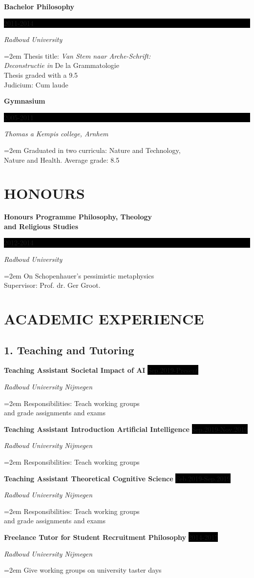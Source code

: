 \documentclass{article}
\newcommand{\sepspace}{\vspace*{1em}}		%
\newcommand{\NewPart}[1]{\section*{\uppercase{#1}}}
\newcommand{\EducationEntry}[4]{
		\noindent \textbf{#1} \hfill      %
		\colorbox{Black}{%
			\parbox{6em}{%
			\hfill\color{White}#2}} \par  %
		\noindent \textit{#3} \par        %
		\noindent\hangindent=2em\hangafter=0 \small #4 %
		\normalsize \par}
\newcommand{\WorkEntry}[4]{				  %
		\noindent \textbf{#1} \hfill      %
		\colorbox{Black}{\color{White}#2} \par  %
		\noindent \textit{#3} \par              %
		\noindent\hangindent=2em\hangafter=0 \small #4 %
		\normalsize \par}
\begin{document}
\sepspace

\EducationEntry{Bachelor Philosophy}{2011-2014}{Radboud University}{Thesis title: \textit{Van Stem naar Arche-Schrift:\\ Deconstructie in} De la Grammatologie\\
Thesis graded with a 9.5\\
Judicium: Cum laude }

\sepspace

\EducationEntry{Gymnasium}{2005-2011}{Thomas a Kempis college, Arnhem}{Graduated in two curricula: Nature and Technology,\\ Nature and Health. Average grade: 8.5
}

\NewPart{Honours}{}

\EducationEntry{Honours Programme Philosophy, Theology\\ and Religious Studies}{2012-2014}{Radboud University}{On Schopenhauer's pessimistic metaphysics\\ Supervisor: Prof. dr. Ger Groot.
}

\sepspace

\NewPart{ACADEMIC EXPERIENCE}{}

\subsection*{1. Teaching and Tutoring}

\WorkEntry{Teaching Assistant Societal Impact of AI}{Sep.2019-Present}{Radboud University Nijmegen}{Responsibilities: Teach working groups\\ and grade assignments and exams }
\sepspace

\WorkEntry{Teaching Assistant Introduction Artificial Intelligence}{Sep.2019-Nov.2019}{Radboud University Nijmegen}{Responsibilities: Teach working groups }
\sepspace

\WorkEntry{Teaching Assistant Theoretical Cognitive Science}{Feb.2019-Sep.2019}{Radboud University Nijmegen}{Responsibilities: Teach working groups\\ and grade assignments and exams }
\sepspace

\WorkEntry{Freelance Tutor for Student Recruitment Philosophy}{2014-2017}{Radboud University Nijmegen}{Give working groups on university taster days}
\sepspace
\end{document}
